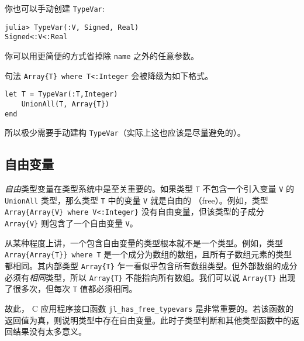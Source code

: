 你也可以手动创建 \texttt{TypeVar}:




\begin{verbatim}
julia> TypeVar(:V, Signed, Real)
Signed<:V<:Real
\end{verbatim}



你可以用更简便的方式省掉除 \texttt{name} 之外的任意参数。



句法 \texttt{Array\{T\} where T<:Integer} 会被降级为如下格式。




\begin{verbatim}
let T = TypeVar(:T,Integer)
    UnionAll(T, Array{T})
end
\end{verbatim}



所以极少需要手动建构 \texttt{TypeVar}（实际上这也应该是尽量避免的）。



\hypertarget{5813562109795449718}{}


\subsection{自由变量}



\emph{自由}类型变量在类型系统中是至关重要的。如果类型 \texttt{T} 不包含一个引入变量 \texttt{V} 的 \texttt{UnionAll} 类型，那么类型 \texttt{T} 中的变量 \texttt{V} 就是自由的 （free）。例如，类型 \texttt{Array\{Array\{V\} where V<:Integer\}} 没有自由变量，但该类型的子成分 \texttt{Array\{V\}} 则包含了一个自由变量 \texttt{V}。



从某种程度上讲，一个包含自由变量的类型根本就不是一个类型。例如，类型 \texttt{Array\{Array\{T\}\} where T} 是一个成分为数组的数组，且所有子数组元素的类型都相同。其内部类型 \texttt{Array\{T\}} 乍一看似乎包含所有数组类型。但外部数组的成分必须有\emph{相同}类型，所以 \texttt{Array\{T\}} 不能指向所有数组。我们可以说 \texttt{Array\{T\}} 出现了很多次，但每次 \texttt{T} 值都必须相同。



故此， C 应用程序接口函数 \texttt{jl\_has\_free\_typevars} 是非常重要的。若该函数的返回值为真，则说明类型中存在自由变量。此时子类型判断和其他类型函数中的返回结果没有太多意义。



\hypertarget{10502823991263434301}{}


